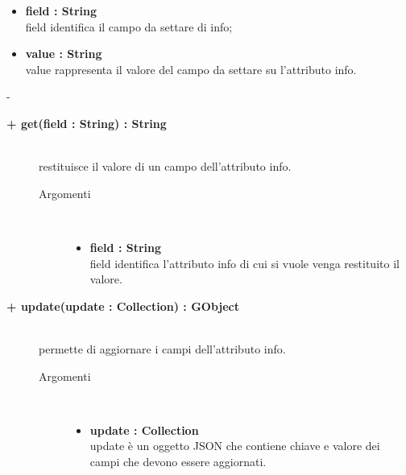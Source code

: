 \begin{description}
\begin{description}
\begin{description}
\begin{itemize}
					\item \textbf{field : String			} \hfill \\
					field identifica il campo da settare di info;
					\item \textbf{value : String			} \hfill \\
					value rappresenta il valore del campo da settare su l'attributo info.
				\end{itemize}
		\end{description}-

\end{description}

\begin{description}
		\item[\textbf{+ get(field : String) : String			}] \hfill \\
			restituisce il valore di un campo dell'attributo info.
			
		\begin{description}
			\item[Argomenti] \hfill \\
				\begin{itemize}
				
					\item \textbf{field : String			} \hfill \\
					field identifica l'attributo info di cui si vuole venga restituito il valore.
				\end{itemize}
		\end{description}

\end{description}

\begin{description}
		\item[\textbf{\color{blue}+ update(update : Collection) : GObject			}] \hfill \\
			permette di aggiornare i campi dell'attributo info.
			
		\begin{description}
			\item[Argomenti] \hfill \\
				\begin{itemize}
				
					\item \textbf{update : Collection			} \hfill \\
					update è un oggetto JSON che contiene chiave e valore dei campi che devono essere aggiornati. 
				\end{itemize}
		\end{description}


\end{description}
\end{description}

